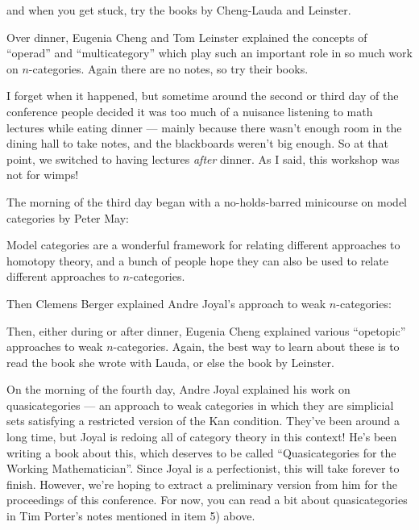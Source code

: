 \documentclass{article}
\def\tightlist{}
\renewcommand{\texttt}[1]{%
  \begingroup
  \ttfamily
  \begingroup\lccode`~=`/\lowercase{\endgroup\def~}{/\discretionary{}{}{}}%
  \begingroup\lccode`~=`[\lowercase{\endgroup\def~}{[\discretionary{}{}{}}%
  \begingroup\lccode`~=`.\lowercase{\endgroup\def~}{.\discretionary{}{}{}}%
  \catcode`/=\active\catcode`[=\active\catcode`.=\active
  \scantokens{#1\noexpand}%
  \endgroup
}
\begin{document}
and when you get stuck, try the books by Cheng-Lauda and Leinster.

Over dinner, Eugenia Cheng and Tom Leinster explained the concepts of
``operad'' and ``multicategory'' which play such an important role in so
much work on \(n\)-categories. Again there are no notes, so try their
books.

I forget when it happened, but sometime around the second or third day
of the conference people decided it was too much of a nuisance listening
to math lectures while eating dinner --- mainly because there wasn't
enough room in the dining hall to take notes, and the blackboards
weren't big enough. So at that point, we switched to having lectures
\emph{after} dinner. As I said, this workshop was not for wimps!

The morning of the third day began with a no-holds-barred minicourse on
model categories by Peter May:


Model categories are a wonderful framework for relating different
approaches to homotopy theory, and a bunch of people hope they can also
be used to relate different approaches to \(n\)-categories.

Then Clemens Berger explained Andre Joyal's approach to weak
\(n\)-categories:


Then, either during or after dinner, Eugenia Cheng explained various
``opetopic'' approaches to weak \(n\)-categories. Again, the best way to
learn about these is to read the book she wrote with Lauda, or else the
book by Leinster.

On the morning of the fourth day, Andre Joyal explained his work on
quasicategories --- an approach to weak categories in which they are
simplicial sets satisfying a restricted version of the Kan condition.
They've been around a long time, but Joyal is redoing all of category
theory in this context! He's been writing a book about this, which
deserves to be called ``Quasicategories for the Working Mathematician''.
Since Joyal is a perfectionist, this will take forever to finish.
However, we're hoping to extract a preliminary version from him for the
proceedings of this conference. For now, you can read a bit about
quasicategories in Tim Porter's notes mentioned in item 5) above.
\end{document}
